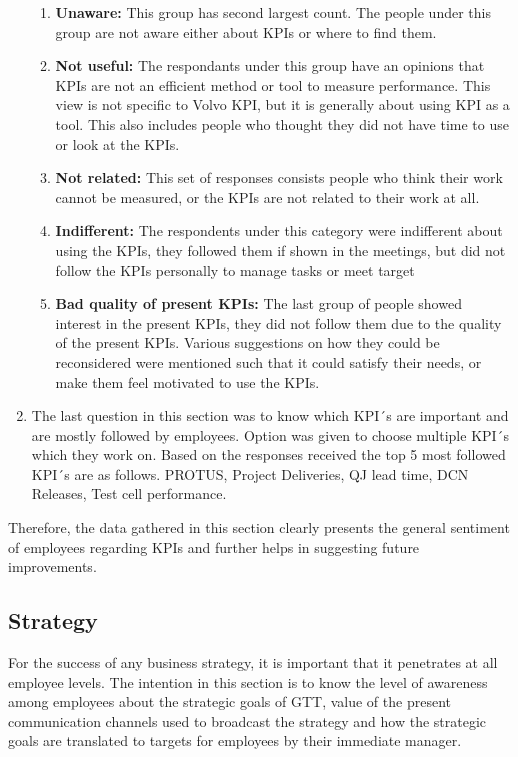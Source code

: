 \begin{enumerate}
\begin{enumerate}
    \item \textbf{Unaware:} This group has second largest count. The people under this group are not aware either about KPIs or where to find them.\\
    \item \textbf{Not useful:} The respondants under this group have an opinions that KPIs are not an efficient method or tool to measure performance. This view is not specific to Volvo KPI, but it is generally about using KPI as a tool. This also includes people who thought they did not have time to use or look at the KPIs.\\
    \item \textbf{Not related:} This set of responses consists people who think their work cannot be measured, or the KPIs are not related to their work at all.\\
    \item \textbf{Indifferent:} The respondents under this category were indifferent about using the KPIs, they followed them if shown in the meetings, but did not follow the KPIs personally to manage tasks or meet target \\
    \item \textbf{Bad quality of present KPIs:} The last group of people showed interest in the present KPIs, they did not follow them due to the quality of the present KPIs. Various suggestions on how they could be reconsidered were mentioned such that it could satisfy their needs, or make them feel motivated to use the KPIs. \\
\end{enumerate}

    \item The last question in this section was to know which KPI´s are important and are mostly followed by employees. Option was given to choose multiple KPI´s which they work on. Based on the responses received the top 5 most followed KPI´s are as follows. PROTUS, Project Deliveries, QJ lead time, DCN Releases, Test cell performance.\\
\end{enumerate}

Therefore, the data gathered in this section clearly presents the general sentiment of employees regarding KPIs and further helps in suggesting future improvements.\\

\subsection{Strategy}
For the success of any business strategy, it is important that it penetrates at all employee levels. The intention in this section is to know the level of awareness among employees about the strategic goals of GTT, value of the present communication channels used to broadcast the strategy and how the strategic goals are translated to targets for employees by their immediate manager.

